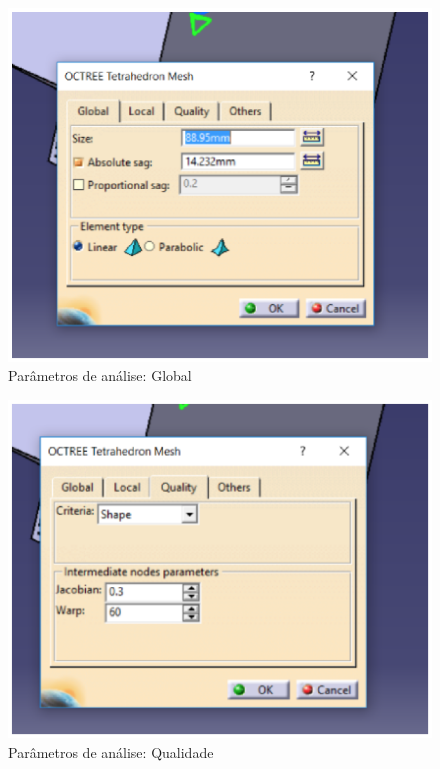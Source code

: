 \begin{figure}[H]
 \centering
   \includegraphics[keepaspectratio=true,scale=0.8]{figuras/estrutura6.eps}
 \caption{Parâmetros de análise: Global}
 \label{estrutura6}
\end{figure}
\begin{figure}[H]
 \centering
   \includegraphics[keepaspectratio=true,scale=0.8]{figuras/estrutura7.eps}
 \caption{Parâmetros de análise: Qualidade}
 \label{estrutura7}
\end{figure}
